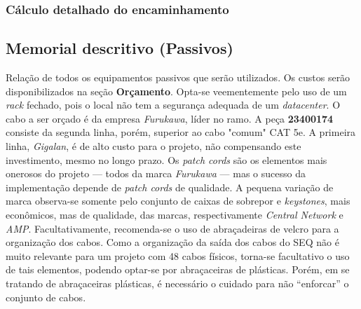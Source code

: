 \documentclass[	DIV=calc,%
							paper=a4,%
							fontsize=12pt,%
							onecolumn]{scrartcl}	 					%
\begin{document}




\subsubsection{Cálculo detalhado do encaminhamento}











\subsection{Memorial descritivo (Passivos)}

Relação de todos os equipamentos passivos que serão utilizados. Os custos serão disponibilizados na seção \textbf{Orçamento}. Opta-se veementemente pelo uso de um \textit{rack} fechado, pois o local não tem a segurança adequada de um \textit{datacenter}. O cabo a ser orçado é da empresa \textit{Furukawa}, líder no ramo. A peça \textbf{23400174} consiste da segunda linha, porém, superior ao cabo "comum" CAT 5e. A primeira linha, \textit{Gigalan}, é de alto custo para o projeto, não compensando este investimento, mesmo no longo prazo. Os \textit{patch cords} são os elementos mais onerosos do projeto --- todos da marca \textit{Furukawa} --- mas o sucesso da implementação depende de \textit{patch cords} de qualidade. A pequena variação de marca observa-se somente pelo conjunto de caixas de sobrepor e \textit{keystones}, mais econômicos, mas de qualidade, das marcas, respectivamente \textit{Central Network} e \textit{AMP}. Facultativamente, recomenda-se o uso de abraçadeiras de velcro para a organização dos cabos. Como a organização da saída dos cabos do SEQ não é muito relevante para um projeto com 48 cabos físicos, torna-se facultativo o uso de tais elementos, podendo optar-se por abraçaceiras de plásticas. Porém, em se tratando de abraçaceiras plásticas, é necessário o cuidado para não ``enforcar'' o conjunto de cabos.




\end{document}
